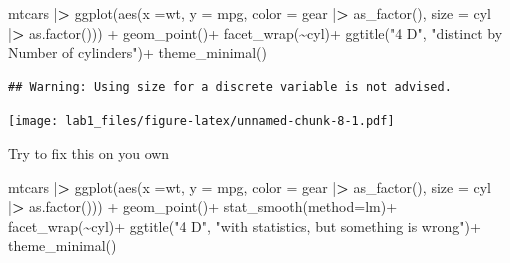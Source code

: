 \documentclass[
]{article}
\newenvironment{Shaded}{\begin{snugshade}}{\end{snugshade}}
\newcommand{\AttributeTok}[1]{\textcolor[rgb]{0.77,0.63,0.00}{#1}}
\newcommand{\ErrorTok}[1]{\textcolor[rgb]{0.64,0.00,0.00}{\textbf{#1}}}
\newcommand{\FunctionTok}[1]{\textcolor[rgb]{0.00,0.00,0.00}{#1}}
\newcommand{\NormalTok}[1]{#1}
\newcommand{\SpecialCharTok}[1]{\textcolor[rgb]{0.00,0.00,0.00}{#1}}
\newcommand{\StringTok}[1]{\textcolor[rgb]{0.31,0.60,0.02}{#1}}
\begin{document}
\begin{Shaded}
\begin{Highlighting}[]
\NormalTok{mtcars }\SpecialCharTok{|}\ErrorTok{\textgreater{}} 
\FunctionTok{ggplot}\NormalTok{(}\FunctionTok{aes}\NormalTok{(}\AttributeTok{x =}\NormalTok{wt, }\AttributeTok{y =}\NormalTok{ mpg, }
           \AttributeTok{color =}\NormalTok{ gear }\SpecialCharTok{|}\ErrorTok{\textgreater{}} \FunctionTok{as\_factor}\NormalTok{(),}
           \AttributeTok{size =}\NormalTok{ cyl }\SpecialCharTok{|}\ErrorTok{\textgreater{}} \FunctionTok{as.factor}\NormalTok{())) }\SpecialCharTok{+}
  \FunctionTok{geom\_point}\NormalTok{()}\SpecialCharTok{+}
  \FunctionTok{facet\_wrap}\NormalTok{(}\SpecialCharTok{\textasciitilde{}}\NormalTok{cyl)}\SpecialCharTok{+} 
  \FunctionTok{ggtitle}\NormalTok{(}\StringTok{"4 D"}\NormalTok{, }\StringTok{"distinct by Number of cylinders"}\NormalTok{)}\SpecialCharTok{+}
  \FunctionTok{theme\_minimal}\NormalTok{()}
\end{Highlighting}
\end{Shaded}

\begin{verbatim}
## Warning: Using size for a discrete variable is not advised.
\end{verbatim}

\texttt{[image: lab1\_files/figure-latex/unnamed-chunk-8-1.pdf]}

Try to fix this on you own

\begin{Shaded}
\begin{Highlighting}[]
\NormalTok{mtcars }\SpecialCharTok{|}\ErrorTok{\textgreater{}} 
\FunctionTok{ggplot}\NormalTok{(}\FunctionTok{aes}\NormalTok{(}\AttributeTok{x =}\NormalTok{wt, }\AttributeTok{y =}\NormalTok{ mpg, }
           \AttributeTok{color =}\NormalTok{ gear }\SpecialCharTok{|}\ErrorTok{\textgreater{}} \FunctionTok{as\_factor}\NormalTok{(),}
           \AttributeTok{size =}\NormalTok{ cyl }\SpecialCharTok{|}\ErrorTok{\textgreater{}} \FunctionTok{as.factor}\NormalTok{())) }\SpecialCharTok{+}
  \FunctionTok{geom\_point}\NormalTok{()}\SpecialCharTok{+}
  \FunctionTok{stat\_smooth}\NormalTok{(}\AttributeTok{method=}\StringTok{\textquotesingle{}lm\textquotesingle{}}\NormalTok{)}\SpecialCharTok{+}
  \FunctionTok{facet\_wrap}\NormalTok{(}\SpecialCharTok{\textasciitilde{}}\NormalTok{cyl)}\SpecialCharTok{+}
  \FunctionTok{ggtitle}\NormalTok{(}\StringTok{"4 D"}\NormalTok{, }\StringTok{"with statistics, but something is wrong"}\NormalTok{)}\SpecialCharTok{+}
  \FunctionTok{theme\_minimal}\NormalTok{()}
\end{Highlighting}
\end{Shaded}
\end{document}
